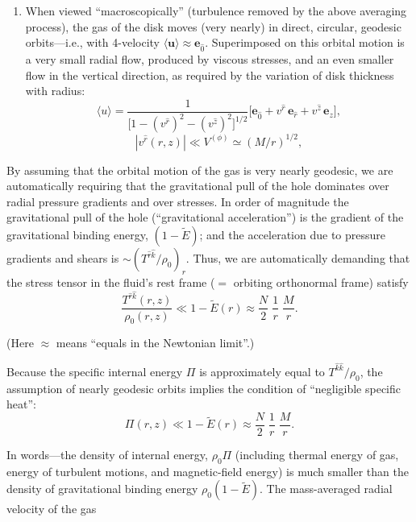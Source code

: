 \begin{enumerate}
\item[(v)] When viewed ``macroscopically'' (turbulence removed by the above
averaging process), the gas of the disk moves (very nearly) in direct,
circular, geodesic orbits---i.e., with 4-velocity $\langle\mathbf{u}\rangle \approx \mathbf{e}_{\hat{0}}$.
Superimposed
on this orbital motion is a very small radial flow, produced by viscous
stresses, and an even smaller flow in the vertical direction, as required
by the variation of disk thickness with radius:
%
\begin{equation}
\langle u\rangle = \frac{1}{\bigl[1-(v^{\hat{r}})^2 - (v^{\hat{z}})^2\bigr]^{1/2}}
\bigl[
  \mathbf{e}_{\hat{0}}
+ v^{\hat{r}}\,\mathbf{e}_{\hat{r}}
+ v^{\hat{z}}\,\mathbf{e}_z
\bigr],
\tag{5.5.4}
\end{equation}
%
\begin{equation}
|v^{\hat{r}}(r,z)| \ll V^{(\phi)} \simeq (M/r)^{1/2},
\tag{5.5.5}
\end{equation}
\end{enumerate}

By assuming that the orbital motion of the gas is very nearly geodesic,
we are automatically requiring that the gravitational pull of the hole
dominates over radial pressure gradients and over stresses.  In
order of magnitude the gravitational pull of the hole (``gravitational
acceleration'') is the gradient of the gravitational binding energy,
$(1 - \tilde{E})$; and the acceleration due to pressure gradients and shears is
$\sim (T^{\hat{r}\hat{k}}/\rho_0)_r$.  Thus, we are automatically demanding that the
stress tensor in the fluid's rest frame ($=$ orbiting orthonormal frame)
satisfy
%
\begin{equation}
\frac{T^{\hat{r}\hat{k}}(r,z)}{\rho_0(r,z)} \ll 1 - \tilde{E}(r)
\approx \frac{N}{2}\;\frac{1}{r}\;\frac{M}{r}.
\tag{5.5.6}
\end{equation}

(Here $\approx$ means ``equals in the Newtonian limit''.)

Because the specific internal energy $\Pi$ is approximately equal to
$T^{\hat{k}\hat{k}}/\rho_0$, the assumption of nearly geodesic orbits implies the condition
of ``negligible specific heat'':
%
\begin{equation}
\Pi(r,z) \ll 1 - \tilde{E}(r)
\approx \frac{N}{2}\;\frac{1}{r}\;\frac{M}{r}.
\tag{5.5.7}
\end{equation}

In words---the density of internal energy, $\rho_0\Pi$ (including thermal
energy of gas, energy of turbulent motions, and magnetic-field energy)
is much smaller than the density of gravitational binding energy
$\rho_0(1 - \tilde{E})$.  The mass-averaged radial velocity of the gas

